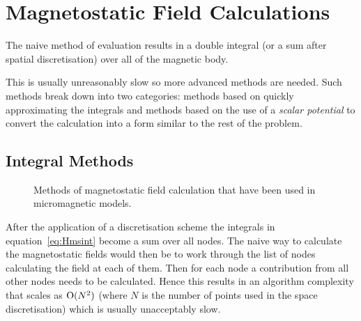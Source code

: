 \section{Magnetostatic Field Calculations}

The naive method of evaluation results in a double integral (or a sum after spatial discretisation) over all of the magnetic body. 

This is usually unreasonably slow so more advanced methods are needed. Such methods break down into two categories: methods based on quickly approximating the integrals and methods based on the use of a \emph{scalar potential} to convert the calculation into a form similar to the rest of the problem.

\subsection{Integral Methods}
\label{sec:magstat-field-calc-inte}

\begin{figure}[h]
  \centering
  \caption{Methods of magnetostatic field calculation that have been used in micromagnetic models.}
  \label{fig:types-mag-stat}
\end{figure}

After the application of a discretisation scheme the integrals in equation~\eqref{eq:Hmsint} become a sum over all nodes. The naive way to calculate the magnetostatic fields would then be to work through the list of nodes calculating the field at each of them. Then for each node a contribution from all other nodes needs to be calculated. Hence this results in an algorithm complexity that scales as $\text{O}(N^2)$ (where $N$ is the number of points used in the space discretisation) which is usually unacceptably slow.

